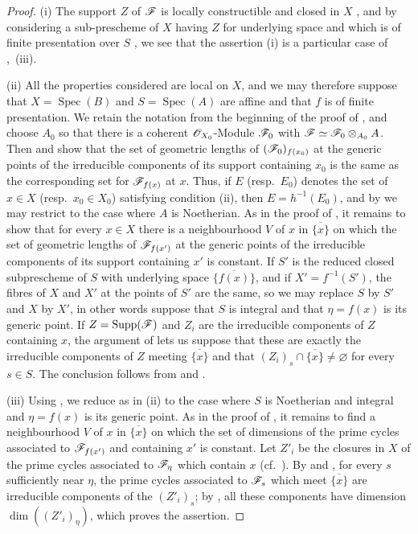 \begin{proof}
\label{IV.9.9.2-proof}
(i) The support $Z$ of $\mathscr{F}$ is locally constructible and closed in $X$ , and by considering a sub-prescheme of $X$ having $Z$ for underlying space and which is of finite presentation over $S$ , we see that the assertion (i) is a particular case of ,~(iii).

(ii) All the properties considered are local on $X$, and we may therefore suppose that $X=\operatorname{Spec}(B)$ and $S=\operatorname{Spec}(A)$ are affine and that $f$ is of finite presentation.
We retain the notation from the beginning of the proof of , and choose $A_0$ so that there is a coherent $\mathscr{O}_{X_0}$-Module $\mathscr{F}_0$ with $\mathscr{F}\simeq\mathscr{F}_0\otimes_{A_0}A$.
Then  and  show that the set of geometric lengths of $(\mathscr{F}_0)_{f(x_0)}$ at the generic points of the irreducible components of its support containing $x_0$ is the same as the corresponding set for $\mathscr{F}_{f(x)}$ at $x$.
Thus, if $E$ (resp.~$E_0$) denotes the set of $x\in X$ (resp.~$x_0\in X_0$) satisfying condition (ii), then $E=h^{-1}(E_0)$, and by  we may restrict to the case where $A$ is Noetherian.
As in the proof of , it remains to show that for every $x\in X$ there is a neighbourhood $V$ of $x$ in $\overline{\{x\}}$ on which the set of geometric lengths of $\mathscr{F}_{f(x')}$ at the generic points of the irreducible components of its support containing $x'$ is constant.
If $S'$ is the reduced closed subprescheme of $S$ with underlying space $\overline{\{f(x)\}}$, and if $X'=f^{-1}(S')$, the fibres of $X$ and $X'$ at the points of $S'$ are the same,
so we may replace $S$ by $S'$ and $X$ by $X'$, in other words suppose that $S$ is integral and that $\eta=f(x)$ is its generic point.
If $Z=\operatorname{Supp}(\mathscr{F})$ and $Z_i$ are the irreducible components of $Z$ containing $x$, the argument of  lets us suppose that these are exactly the irreducible components of $Z$ meeting $\overline{\{x\}}$ and that $(Z_i)_s\cap\overline{\{x\}}\neq\varnothing$ for every $s\in S$.
The conclusion follows from  and .

(iii) Using , we reduce as in (ii) to the case where $S$ is Noetherian and integral and $\eta=f(x)$ is its generic point.
As in the proof of , it remains to find a neighbourhood $V$ of $x$ in $\overline{\{x\}}$ on which the set of dimensions of the prime cycles associated to $\mathscr{F}_{f(x')}$ and containing $x'$ is constant.
Let $Z'_i$ be the closures in $X$ of the prime cycles associated to $\mathscr{F}_\eta$ which contain $x$ (cf.~).
By  and , for every $s$ sufficiently near $\eta$, the prime cycles associated to $\mathscr{F}_s$ which meet $\overline{\{x\}}$ are irreducible components of the $(Z'_i)_s$; by , all these components have dimension $\dim((Z'_i)_\eta)$, which proves the assertion.


\end{proof}

